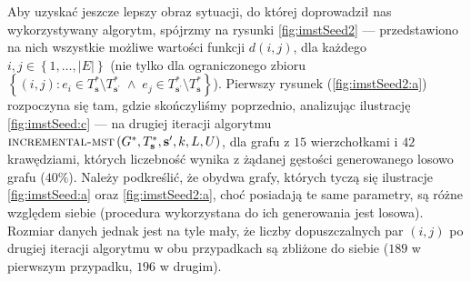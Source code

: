 {Aby uzyskać jeszcze lepszy obraz sytuacji, do której doprowadził nas wykorzystywany algorytm, spójrzmy na rysunki \ref{fig:imstSeed2} --- przedstawiono na nich wszystkie możliwe wartości funkcji $d \left( i, j \right)$, dla każdego $i, j \in \left\{ 1, \dots, \left| E \right| \right\}$ (nie tylko dla ograniczonego zbioru $\left\{ \left( i, j \right) : e_{i} \in T^{\ast}_{\textbf{s}} \setminus T^{\ast}_{\textbf{s}^{\prime}} \; \wedge \; e_{j} \in T^{\ast}_{\textbf{s}^{\prime}} \setminus T^{\ast}_{\textbf{s}} \right\}$). Pierwszy rysunek (\ref{fig:imstSeed2:a}) rozpoczyna się tam, gdzie skończyliśmy poprzednio, analizując ilustrację \ref{fig:imstSeed:c} --- na drugiej iteracji algorytmu $\textsc{incremental-mst} \left( G^{\ast}, T^{\ast}_{\textbf{s}}, \textbf{s}^{\prime}, k, L, U \right)$, dla grafu z $15$ wierzchołkami i $42$ krawędziami, których liczebność wynika z żądanej gęstości generowanego losowo grafu ($40\%$). Należy podkreślić, że obydwa grafy, których tyczą się ilustracje \ref{fig:imstSeed:a} oraz \ref{fig:imstSeed2:a}, choć posiadają te same parametry, są różne  względem siebie (procedura wykorzystana do ich generowania jest losowa). Rozmiar danych jednak jest na tyle mały, że liczby dopuszczalnych par $\left( i, j \right)$ po drugiej iteracji algorytmu w obu przypadkach są zbliżone do siebie ($189$ w pierwszym przypadku, $196$ w drugim).

}
